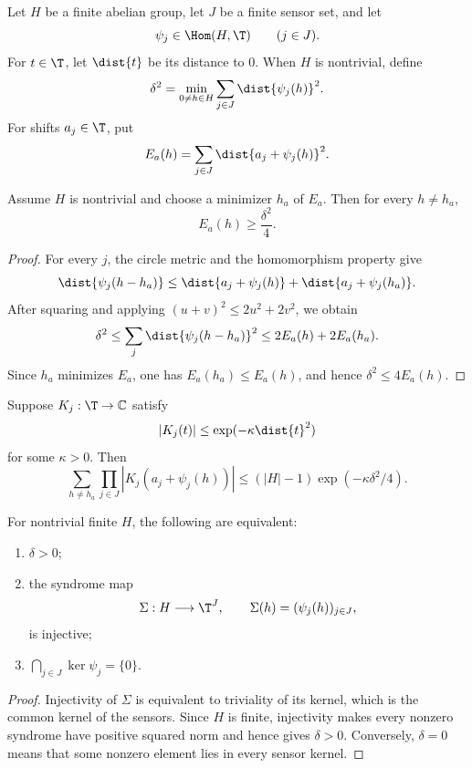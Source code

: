 Let $H$ be a finite abelian group, let $J$ be a finite sensor set, and let
\[
 \psi_j\in\Hom(H,\T)
 \qquad (j\in J).
\]
For $t\in\T$, let $\dist{t}$ be its distance to $0$.  When $H$ is nontrivial, define
\[
 \delta^2=\min_{0\neq h\in H}\sum_{j\in J}\dist{\psi_j(h)}^2.
\]
For shifts $a_j\in\T$, put
\[
 E_a(h)=\sum_{j\in J}\dist{a_j+\psi_j(h)}^2.
\]

\begin{theorem}
\label{thm:syndrome-separation}
Assume $H$ is nontrivial and choose a minimizer $h_a$ of $E_a$.  Then for every $h\neq h_a$,
\[
 E_a(h)\geq\frac{\delta^2}{4}.
\]
\end{theorem}

\begin{proof}
For every $j$, the circle metric and the homomorphism property give
\[
 \dist{\psi_j(h-h_a)}
 \leq \dist{a_j+\psi_j(h)}+\dist{a_j+\psi_j(h_a)}.
\]
After squaring and applying $(u+v)^2\leq2u^2+2v^2$, we obtain
\[
 \delta^2
 \leq\sum_j\dist{\psi_j(h-h_a)}^2
 \leq2E_a(h)+2E_a(h_a).
\]
Since $h_a$ minimizes $E_a$, one has $E_a(h_a)\leq E_a(h)$, and hence $\delta^2\leq4E_a(h)$.
\end{proof}

\begin{corollary}
\label{cor:syndrome-tail}
Suppose $K_j:\T\to\mathbb C$ satisfy
\[
 |K_j(t)|\leq\exp(-\kappa\dist{t}^2)
\]
for some $\kappa>0$.  Then
\[
 \sum_{h\neq h_a}\prod_{j\in J}|K_j(a_j+\psi_j(h))|
 \leq(|H|-1)\exp(-\kappa\delta^2/4).
\]
\end{corollary}

\begin{proposition}
\label{prop:qualitative-observability}
For nontrivial finite $H$, the following are equivalent:
\begin{enumerate}[label=(\roman*)]
\item $\delta>0$;
\item the syndrome map
\[
 \Sigma:H\longrightarrow\T^J,
 \qquad
 \Sigma(h)=(\psi_j(h))_{j\in J},
\]
is injective;
\item $\bigcap_{j\in J}\ker\psi_j=\{0\}$.
\end{enumerate}
\end{proposition}

\begin{proof}
Injectivity of $\Sigma$ is equivalent to triviality of its kernel, which is the common kernel of the sensors.  Since $H$ is finite, injectivity makes every nonzero syndrome have positive squared norm and hence gives $\delta>0$.  Conversely, $\delta=0$ means that some nonzero element lies in every sensor kernel.
\end{proof}

